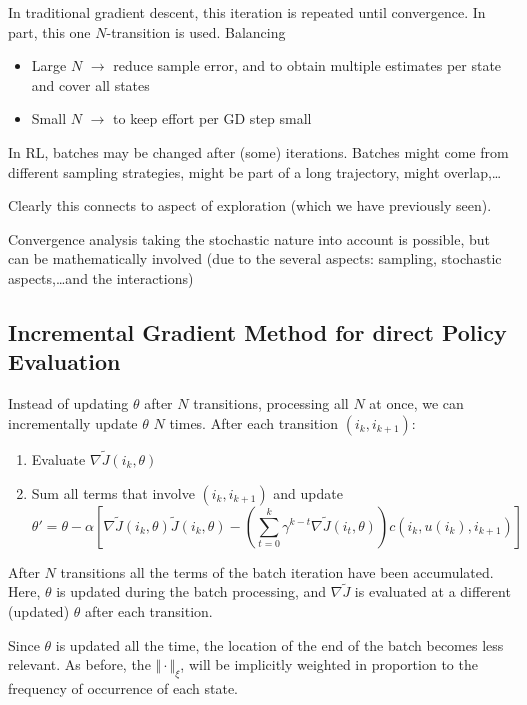 In traditional gradient descent, this iteration is repeated until convergence. In part, this 
one \(N\)-transition is  used. Balancing
\begin{itemize}
    \item Large \(N\) \(\to\) reduce sample error, and to obtain multiple estimates per state and cover all states  
    \item Small \(N\) \(\to \) to keep effort per GD step small 
\end{itemize} 

In RL, batches may be changed after (some) iterations. Batches might come from different sampling 
strategies, might be part of a long trajectory, might overlap,\dots

Clearly this connects to aspect of exploration (which we have previously seen).

\begin{remark}
    Convergence analysis taking the stochastic nature into account is possible, but can be mathematically
    involved (due to the several aspects: sampling, stochastic aspects,\dots and the interactions)      
\end{remark}

\subsection{Incremental Gradient Method for direct Policy Evaluation}

Instead of updating \(\theta\)  after \(N\) transitions, processing all \(N\)
at once, we can incrementally update \(\theta\) \(N\) times. After each 
transition \((i_k,i_{k+1})\):
\begin{enumerate}
    \item Evaluate \(\nabla\tilde{J}(i_k,\theta)\)
    \item Sum all terms that involve \((i_k,i_{k+1})\) and update 
    \[\theta'=\theta-\alpha\left[\nabla \tilde{J}(i_k,\theta)\tilde{J}(i_k,\theta)-\left(\sum_{t=0}^{k}\gamma^{k-t}\nabla\tilde{J}(i_t,\theta)\right)c(i_k,u(i_k),i_{k+1}) \right]\]
\end{enumerate}

After \(N\) transitions all the terms of the batch iteration have been accumulated. Here, 
\(\theta\) is updated during the batch processing, and 
\(\nabla\tilde{J}\) is evaluated at a different (updated) \(\theta\) after each transition.

Since \(\theta\) is updated all the time, the location of the end of the batch becomes less relevant. 
As before, the \(\Vert \cdot\Vert_\xi\), will be implicitly weighted 
in proportion to the frequency of  occurrence of each state.

